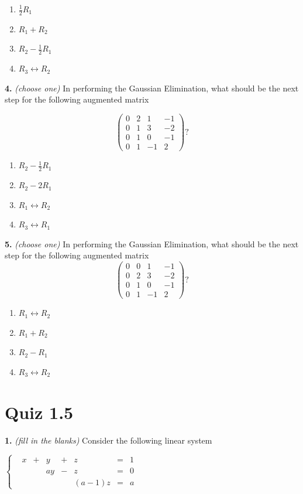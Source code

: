 \documentclass[10pt,a4paper]{article}
\begin{document}
\begin{enumerate}[label=(\Alph*)]
\item \(\frac{1}{2}R_1\)
\item \(R_1+R_2\)
\item \(R_2-\frac{1}{2}R_1\)
\item \(R_3\leftrightarrow R_2\)
\end{enumerate}
\smallskip
\textbf{4.} \textit{(choose one)} In performing the Gaussian Elimination, what should be the next step for the following augmented matrix

\[\left(\begin{array}{ccc|c}     0&2&1&-1\\     0&1&3&-2\\     0&1&0&-1\\     0&1&-1&2\end{array}\right)?\]

\begin{enumerate}[label=(\Alph*)]
\item \(R_2-\frac{1}{2}R_1\)
\item \(R_2- 2R_1\)
\item \(R_1\leftrightarrow R_2\)
\item \(R_3\leftrightarrow R_1\)
\end{enumerate}
\smallskip
\textbf{5.} \textit{(choose one)} In performing the Gaussian Elimination, what should be the next step for the following augmented matrix \[\left(\begin{array}{ccc|c}      0&0&1&-1\\      0&2&3&-2\\      0&1&0&-1\\      0&1&-1&2 \end{array}\right)?\]

\begin{enumerate}[label=(\Alph*)]
\item \(R_1\leftrightarrow R_2\)
\item \(R_1+R_2\)
\item \(R_2-R_1\)
\item \(R_3\leftrightarrow R_2\)
\end{enumerate}
\smallskip
\section{Quiz 1.5}
\textbf{1.} \textit{(fill in the blanks)} Consider the following linear system

\(\left\{\begin{array}{ccccc}&x&+&y&+&z&=&1\\ &&&ay&-&z&=&0\\&&&&& (a-1)z&=&a \end{array}\right.\)
\end{document}
